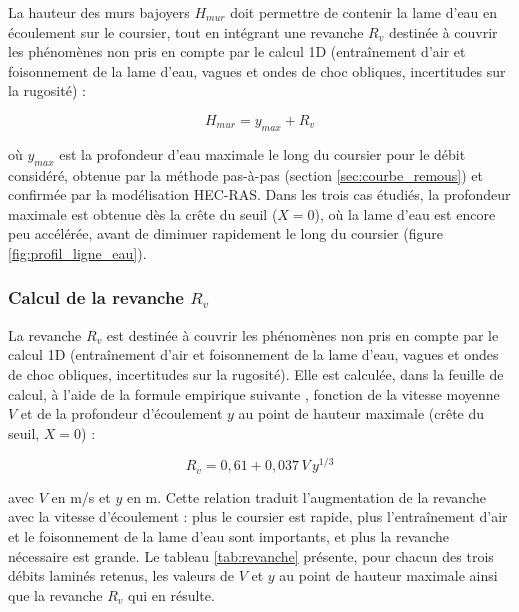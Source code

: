 La hauteur des murs bajoyers $H_{mur}$ doit permettre de contenir la lame d'eau en écoulement sur le coursier, tout en intégrant une revanche $R_v$ destinée à couvrir les phénomènes non pris en compte par le calcul 1D (entraînement d'air et foisonnement de la lame d'eau, vagues et ondes de choc obliques, incertitudes sur la rugosité) :

\begin{equation}
H_{mur} = y_{max} + R_v
\label{eq:hauteur_mur}
\end{equation}

où $y_{max}$ est la profondeur d'eau maximale le long du coursier pour le débit considéré, obtenue par la méthode pas-à-pas (section \ref{sec:courbe_remous}) et confirmée par la modélisation HEC-RAS. Dans les trois cas étudiés, la profondeur maximale est obtenue dès la crête du seuil ($X=0$), où la lame d'eau est encore peu accélérée, avant de diminuer rapidement le long du coursier (figure \ref{fig:profil_ligne_eau}).

\subsubsection{Calcul de la revanche $R_v$}
\label{subsubsec:calcul_revanche}

La revanche $R_v$ est destinée à couvrir les phénomènes non pris en compte par le calcul 1D (entraînement d'air et foisonnement de la lame d'eau, vagues et ondes de choc obliques, incertitudes sur la rugosité). Elle est calculée, dans la feuille de calcul, à l'aide de la formule empirique suivante \cite{usbr1987design}, fonction de la vitesse moyenne $V$ et de la profondeur d'écoulement $y$ au point de hauteur maximale (crête du seuil, $X=0$) :

\begin{equation}
R_v = 0{,}61 + 0{,}037 \, V \, y^{1/3}
\label{eq:revanche}
\end{equation}

avec $V$ en m/s et $y$ en m. Cette relation traduit l'augmentation de la revanche avec la vitesse d'écoulement : plus le coursier est rapide, plus l'entraînement d'air et le foisonnement de la lame d'eau sont importants, et plus la revanche nécessaire est grande. Le tableau \ref{tab:revanche} présente, pour chacun des trois débits laminés retenus, les valeurs de $V$ et $y$ au point de hauteur maximale ainsi que la revanche $R_v$ qui en résulte.


